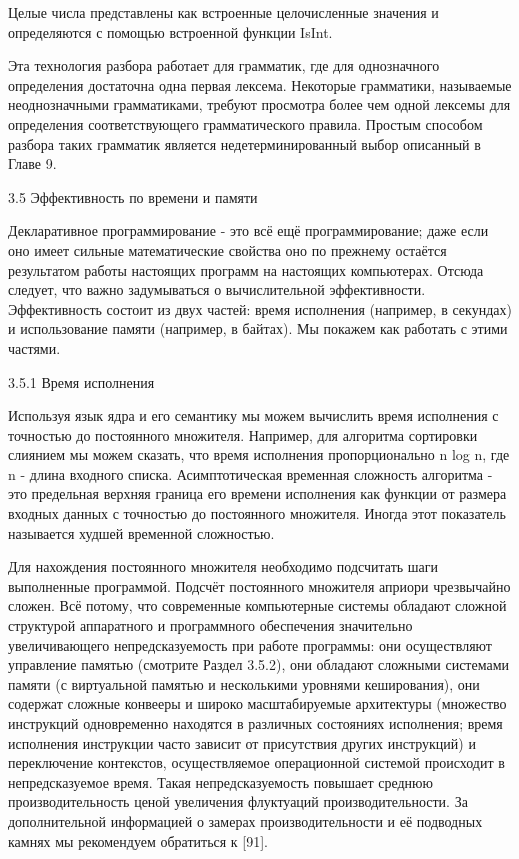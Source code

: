 Целые числа представлены как встроенные целочисленные значения и определяются с помощью встроенной функции IsInt.

Эта технология разбора работает для грамматик, где для однозначного определения достаточна одна первая лексема. Некоторые грамматики, называемые неоднозначными грамматиками, требуют просмотра более чем одной лексемы для определения соответствующего грамматического правила. Простым способом разбора таких грамматик является недетерминированный выбор описанный в Главе 9.

3.5 Эффективность по времени и памяти

Декларативное программирование - это всё ещё программирование; даже если оно имеет сильные математические свойства оно по прежнему остаётся результатом работы настоящих программ на настоящих компьютерах. Отсюда следует, что важно задумываться о вычислительной эффективности. Эффективность состоит из двух частей: время исполнения (например, в секундах) и использование памяти (например, в байтах). Мы покажем как работать с этими частями.

3.5.1 Время исполнения

Используя язык ядра и его семантику мы можем вычислить время исполнения с точностью до постоянного множителя. Например, для алгоритма сортировки слиянием мы можем сказать, что время исполнения пропорционально n log n, где n - длина входного списка. Асимптотическая временная сложность алгоритма - это предельная верхняя граница его времени исполнения как функции от размера входных данных с точностью до постоянного множителя. Иногда этот показатель называется худшей временной сложностью.

Для нахождения постоянного множителя необходимо подсчитать шаги выполненные программой. Подсчёт постоянного множителя априори чрезвычайно сложен. Всё потому, что современные компьютерные системы обладают сложной структурой аппаратного и программного обеспечения значительно увеличивающего непредсказуемость при работе программы: они осуществляют управление памятью (смотрите Раздел 3.5.2), они обладают сложными системами памяти (с виртуальной памятью и несколькими уровнями кеширования), они содержат сложные конвееры и широко масштабируемые архитектуры (множество инструкций одновременно находятся в различных состояниях исполнения; время исполнения инструкции часто зависит от присутствия других инструкций) и переключение контекстов, осуществляемое операционной системой происходит в непредсказуемое время. Такая непредсказуемость повышает среднюю производительность ценой увеличения флуктуаций производительности. За дополнительной информацией о замерах производительности и её подводных камнях мы рекомендуем обратиться к [91].

